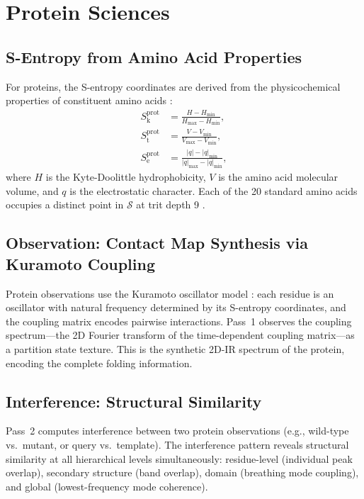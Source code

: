 \documentclass[11pt,twocolumn,a4paper]{article}
\theoremstyle{definition}
\theoremstyle{remark}
\newcommand{\Sk}{S_{\mathrm{k}}}
\newcommand{\St}{S_{\mathrm{t}}}
\newcommand{\Se}{S_{\mathrm{e}}}
\newcommand{\Sspace}{\mathcal{S}}
\begin{document}
\section{Protein Sciences}
\label{sec:protein}

\subsection{S-Entropy from Amino Acid Properties}

For proteins, the S-entropy coordinates are derived from the physicochemical properties of constituent amino acids \citep{sachikonye2025c}:
\begin{align}
\Sk^{\mathrm{prot}} &= \frac{H - H_{\min}}{H_{\max} - H_{\min}}, \label{eq:sk_prot} \\
\St^{\mathrm{prot}} &= \frac{V - V_{\min}}{V_{\max} - V_{\min}}, \label{eq:st_prot} \\
\Se^{\mathrm{prot}} &= \frac{|q| - |q|_{\min}}{|q|_{\max} - |q|_{\min}}, \label{eq:se_prot}
\end{align}
where $H$ is the Kyte-Doolittle hydrophobicity, $V$ is the amino acid molecular volume, and $q$ is the electrostatic character. Each of the 20 standard amino acids occupies a distinct point in $\Sspace$ at trit depth 9 \citep{sachikonye2025c}.

\subsection{Observation: Contact Map Synthesis via Kuramoto Coupling}

Protein observations use the Kuramoto oscillator model \citep{kuramoto1975, sachikonye2025_partition}: each residue is an oscillator with natural frequency determined by its S-entropy coordinates, and the coupling matrix encodes pairwise interactions. Pass~1 observes the coupling spectrum---the 2D Fourier transform of the time-dependent coupling matrix---as a partition state texture. This is the synthetic 2D-IR spectrum of the protein, encoding the complete folding information.

\subsection{Interference: Structural Similarity}

Pass~2 computes interference between two protein observations (e.g., wild-type vs.\ mutant, or query vs.\ template). The interference pattern reveals structural similarity at all hierarchical levels simultaneously: residue-level (individual peak overlap), secondary structure (band overlap), domain (breathing mode coupling), and global (lowest-frequency mode coherence).
\end{document}
